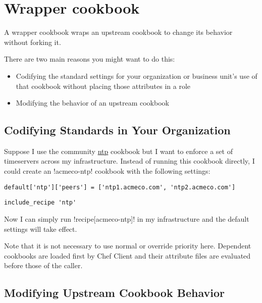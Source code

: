 \section{Wrapper cookbook}
\label{sec:tat-wrapper-cookbook}

A wrapper cookbook wraps an upstream cookbook to change its behavior without forking it.

There are two main reasons you might want to do this:

\begin{itemize}
  \item Codifying the standard settings for your organization or business unit’s use of that cookbook without placing those attributes in a role
  \item Modifying the behavior of an upstream cookbook
\end{itemize}


\subsection{Codifying Standards in Your Organization}

Suppose I use the community \href{http://community.opscode.com/cookbooks/ntp}{ntp} cookbook but I want to enforce a set of timeservers across my infrastructure. Instead of running this cookbook directly, I could create an \inline!acmeco-ntp! cookbook with the following settings:

\begin{lstlisting}[label=lst:wrapper-cookbook1,caption=acmeco-ntp/attributes/default.rb]
default['ntp']['peers'] = ['ntp1.acmeco.com', 'ntp2.acmeco.com']
\end{lstlisting}

\begin{lstlisting}[label=lst:wrapper-cookbook2,caption=acmeco-ntp/recipes/default.rb]
include_recipe 'ntp'
\end{lstlisting}

Now I can simply run \inline!recipe[acmeco-ntp]! in my infrastructure and the default settings will take effect.

Note that it is not necessary to use normal or override priority here. Dependent cookbooks are loaded first by Chef Client and their attribute files are evaluated before those of the caller.


\subsection{Modifying Upstream Cookbook Behavior}


